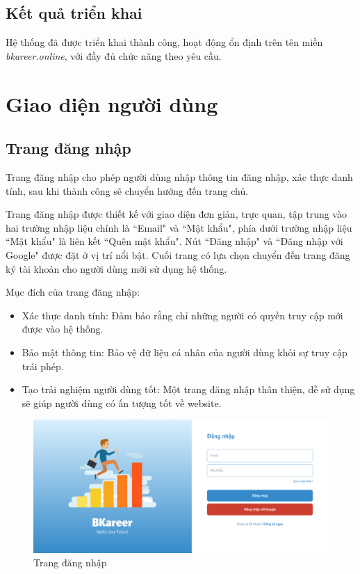\subsection{Kết quả triển khai}
Hệ thống đã được triển khai thành công, hoạt động ổn định trên tên miền \textit{bkareer.online}, với đầy đủ chức năng theo yêu cầu.


\section{Giao diện người dùng}
\subsection{Trang đăng nhập}
Trang đăng nhập cho phép người dùng nhập thông tin đăng nhập, xác thực danh tính, sau khi thành công sẽ chuyển hướng đến trang chủ.

Trang đăng nhập được thiết kế với giao diện đơn giản, trực quan, tập trung vào hai trường nhập liệu chính là ``Email" và ``Mật khẩu", phía dưới trường nhập liệu ``Mật khẩu" là liên kết ``Quên mật khẩu". Nút ``Đăng nhập" và ``Đăng nhập với Google" được đặt ở vị trí nổi bật. Cuối trang có lựa chọn chuyển đến trang đăng ký tài khoản cho người dùng mới sử dụng hệ thống.

Mục đích của trang đăng nhập:
\begin{itemize}
    \item Xác thực danh tính: Đảm bảo rằng chỉ những người có quyền truy cập mới được vào hệ thống.
    \item Bảo mật thông tin: Bảo vệ dữ liệu cá nhân của người dùng khỏi sự truy cập trái phép.
    \item Tạo trải nghiệm người dùng tốt: Một trang đăng nhập thân thiện, dễ sử dụng sẽ giúp người dùng có ấn tượng tốt về website.
\end{itemize}

\begin{figure}[H]
    \centering
    \includegraphics[width=0.8\linewidth]{images/chap5/login.png}
    \vspace{0.5cm}
    \caption{Trang đăng nhập}
\end{figure}

